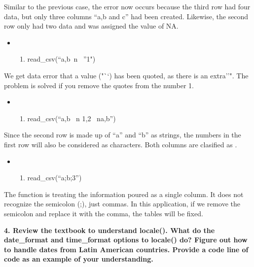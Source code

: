 \documentclass[
]{article}
\providecommand{\tightlist}{%
  \setlength{\itemsep}{0pt}\setlength{\parskip}{0pt}}
\begin{document}
Similar to the previous case, the error now occurs because the third row
had four data, but only three columns ``a,b and c'' had been created.
Likewise, the second row only had two data and was assigned the value of
NA.

\begin{itemize}
\item
  \begin{enumerate}
  \def\labelenumi{\arabic{enumi}.}
  \setcounter{enumi}{2}
  \tightlist
  \item
    read\_csv(``a,b~n ~''1")
  \end{enumerate}
\end{itemize}

We get data error that a value ("``) has been quoted, as there is an
extra''". The problem is solved if you remove the quotes from the number
1.

\begin{itemize}
\item
  \begin{enumerate}
  \def\labelenumi{\arabic{enumi}.}
  \setcounter{enumi}{3}
  \tightlist
  \item
    read\_csv(``a,b ~n 1,2 ~na,b'')
  \end{enumerate}
\end{itemize}

Since the second row is made up of ``a'' and ``b'' as strings, the
numbers in the first row will also be considered as characters. Both
columns are clasified as .

\begin{itemize}
\item
  \begin{enumerate}
  \def\labelenumi{\arabic{enumi}.}
  \setcounter{enumi}{4}
  \tightlist
  \item
    read\_csv(``a;b;3'')
  \end{enumerate}
\end{itemize}

The function is treating the information poured as a single column. It
does not recognize the semicolon (;), just commas. In this application,
if we remove the semicolon and replace it with the comma, the tables
will be fixed.

\textbf{4. Review the textbook to understand locale(). What do the
date\_format and time\_format options to locale() do? Figure out how to
handle dates from Latin American countries. Provide a code line of code
as an example of your understanding.}
\end{document}
